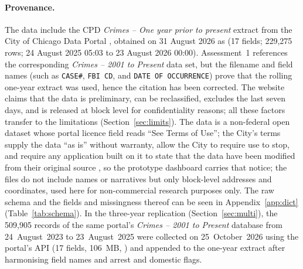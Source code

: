 \documentclass[11pt,a4paper]{report}
\begin{document}
\paragraph{Provenance.} The data include the CPD \emph{Crimes -- One year prior to present} extract from the City of Chicago Data Portal \citep{cpd2026}, obtained on 31 August 2026 as  (17 fields; 229,275 rows; 24 August 2025 05:03 to 23 August 2026 00:00). Assessment~1 references the corresponding \emph{Crimes -- 2001 to Present} data set, but the filename and field names (such as \texttt{CASE\#}, \texttt{FBI CD}, and \texttt{DATE OF OCCURRENCE}) prove that the rolling one-year extract was used, hence the citation has been corrected. The website claims that the data is preliminary, can be reclassified, excludes the last seven days, and is released at block level for confidentiality reasons; all these factors transfer to the limitations (Section~\ref{sec:limits}). The data is a non-federal open dataset whose portal licence field reads ``See Terms of Use''; the City's terms supply the data ``as is'' without warranty, allow the City to require use to stop, and require any application built on it to state that the data have been modified from their original source \citep{chicago2026terms}, so the prototype dashboard carries that notice; the files do not include names or narratives but only block-level addresses and coordinates, used here for non-commercial research purposes only. The raw schema and the fields and missingness thereof can be seen in Appendix~\ref{app:dict} (Table~\ref{tab:schema}). In the three-year replication (Section~\ref{sec:multi}), the 509,905 records of the same portal's \emph{Crimes -- 2001 to Present} database \citep{cpd2026b} from 24~August~2023 to 23~August~2025 were collected on 25~October~2026 using the portal's API (17 fields, 106~MB, ) and appended to the one-year extract after harmonising field names and arrest and domestic flags.
\end{document}
